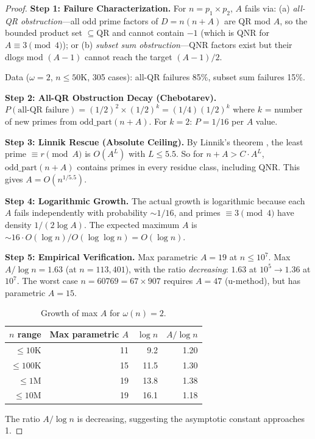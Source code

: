 \documentclass[11pt,a4paper]{article}
\theoremstyle{plain}
\theoremstyle{definition}
\newcommand{\QR}{\mathrm{QR}}
\newcommand{\oddpart}{\mathrm{odd\_part}}
\begin{document}
\begin{proof}
\medskip
\noindent\textbf{Step 1: Failure Characterization.}
For $n = p_1 \times p_2$, $A$ fails via: (a) \emph{all-QR obstruction}---all odd prime factors of $D = n(n+A)$ are QR mod $A$, so the bounded product set $\subseteq \QR$ and cannot contain $-1$ (which is QNR for $A \equiv 3 \pmod 4$); or (b) \emph{subset sum obstruction}---QNR factors exist but their dlogs mod $(A-1)$ cannot reach the target $(A-1)/2$.

Data ($\omega = 2$, $n \leq 50\text{K}$, 305 cases): all-QR failures 85\%, subset sum failures 15\%.

\medskip
\noindent\textbf{Step 2: All-QR Obstruction Decay (Chebotarev).}
$P(\text{all-QR failure}) = (1/2)^2 \times (1/2)^k = (1/4)(1/2)^k$ where $k$ = number of new primes from $\oddpart(n+A)$. For $k = 2$: $P = 1/16$ per $A$ value.

\medskip
\noindent\textbf{Step 3: Linnik Rescue (Absolute Ceiling).}
By Linnik's theorem \cite{xylouris2011}, the least prime $\equiv r \pmod{A}$ is $O(A^L)$ with $L \leq 5.5$. So for $n + A > C \cdot A^L$, $\oddpart(n+A)$ contains primes in every residue class, including QNR. This gives $A = O(n^{1/5.5})$.

\medskip
\noindent\textbf{Step 4: Logarithmic Growth.}
The actual growth is logarithmic because each $A$ fails independently with probability $\sim 1/16$, and primes $\equiv 3 \pmod 4$ have density $1/(2\log A)$. The expected maximum $A$ is $\sim 16 \cdot O(\log n)/O(\log \log n) = O(\log n)$.

\medskip
\noindent\textbf{Step 5: Empirical Verification.}
Max parametric $A = 19$ at $n \leq 10^7$. Max $A/\log n = 1.63$ (at $n = 113{,}401$), with the ratio \emph{decreasing}: $1.63$ at $10^5 \to 1.36$ at $10^7$. The worst case $n = 60769 = 67 \times 907$ requires $A = 47$ (u-method), but has parametric $A = 15$.

\begin{table}[h]
\centering
\caption{Growth of max $A$ for $\omega(n) = 2$.}
\begin{tabular}{rrrr}
\toprule
$n$ range & Max parametric $A$ & $\log n$ & $A/\log n$ \\
\midrule
$\leq 10\text{K}$ & 11 & 9.2 & 1.20 \\
$\leq 100\text{K}$ & 15 & 11.5 & 1.30 \\
$\leq 1\text{M}$ & 19 & 13.8 & 1.38 \\
$\leq 10\text{M}$ & 19 & 16.1 & 1.18 \\
\bottomrule
\end{tabular}
\end{table}

The ratio $A/\log n$ is decreasing, suggesting the asymptotic constant approaches 1.
\end{proof}
\end{document}
